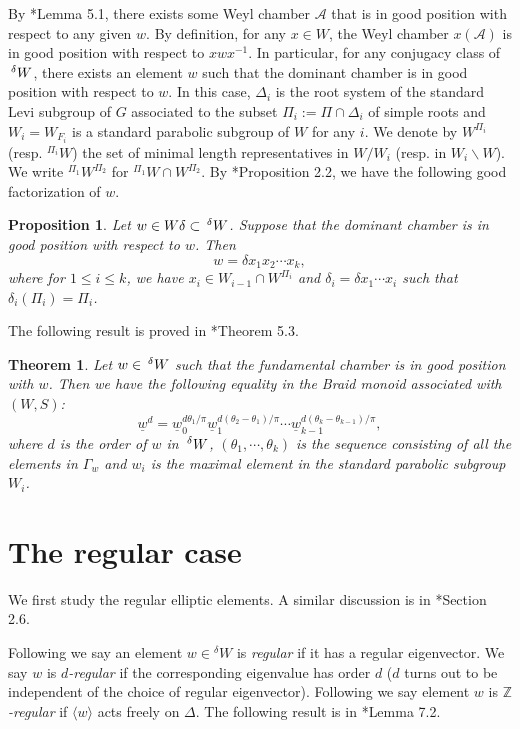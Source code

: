\documentclass[10pt,leqno]{article}
\newtheorem{theorem}[equation]{Theorem}
\newtheorem{proposition}[equation]{Proposition}
\newcommand{\caA}{\mathcal A}
\renewcommand{\sec}[1]{\section{#1}
\renewcommand{\theequation}{\thesection.\arabic{equation}}
  \setcounter{equation}{0}}
\newcommand{\Wext}{\negthinspace\negthinspace\phantom{a}^\delta W}
\def\le{\leqslant}
\def\G{\Gamma}
\def\d{\delta}
\renewcommand{\sec}[1]{\section{#1}
\renewcommand{\theequation}{\thesection.\arabic{equation}}
  \setcounter{equation}{0}}
\begin{document}
By \cite{he_nie_minimal_finite}*{Lemma 5.1}, there exists some Weyl chamber $\caA$ that is
in good position with respect to any given $w$. By definition, for any
$x \in W$, the Weyl chamber $x(\caA)$ is in good position with respect
to $x w x^{-1}$. In particular, for any conjugacy class of $\Wext$,
there exists an element $w$ such that the dominant chamber is in good
position with respect to $w$. In this case, $\Delta_i$ is the root system
of the standard Levi subgroup of $G$ associated to the subset
$\Pi_i:=\Pi \cap \Delta_i$ of simple roots and $W_i=W_{F_i}$ is a standard
parabolic subgroup of $W$ for any $i$. We denote by $W^{\Pi_i}$ (resp. ${}^{\Pi_i} W$) the
set of minimal length representatives in $W/W_i$ (resp. in $W_i \backslash W$). We write ${}^{\Pi_1} W^{\Pi_2}$ for ${}^{\Pi_1} W \cap W^{\Pi_2}$. By \cite{he_nie_minimal_finite}*{Proposition
2.2}, we have the following good factorization of $w$.

\begin{proposition}\label{good-fac} Let $w \in W \d \subset
\Wext$. Suppose that the dominant chamber is in good position with
respect to $w$. Then $$w=\d x_1 x_2 \cdots x_k,$$ where for $1 \le i
\le k$, we have $x_i \in W_{i-1} \cap W^{\Pi_i}$ and $\d_i=\d x_1
\cdots x_{i}$ such that $\d_i (\Pi_i)=\Pi_i$.
\end{proposition}

The following result is proved in \cite{he_nie_minimal_finite}*{Theorem 5.3}.

\begin{theorem}
\label{t:braid}
Let $w \in \Wext$ such that the fundamental chamber is
in good position with $w$. Then we have the following equality in the
Braid monoid associated with $(W, S)$: $$\underline w^d=\underline
w_0^{d \theta_1/\pi} \underline w_1^{d (\theta_2-\theta_1)/\pi} \cdots
\underline w_{k-1}^{d (\theta_{k}-\theta_{k-1})/\pi},$$ where $d$ is
the order of $w$ in $\Wext$, $(\theta_1, \cdots,
\theta_k)$ is the sequence consisting of all the elements in $\G_{w}$
and $w_i$ is the maximal element in the standard parabolic subgroup
$W_i$.
\end{theorem}

\sec{The regular case}
\label{s:regular}

We first study the regular elliptic elements. 
A similar discussion is in \cite{reeder_torsion}*{Section 2.6}.

Following
\cite{springer_regular} we say an element $w \in {}^{\delta} W$ is {\it regular} if it has a
regular eigenvector. We say $w$ is {\it $d$-regular} if the corresponding eigenvalue has
order $d$ ($d$ turns out to be independent of the choice of regular eigenvector).
Following \cite{rgly} we say
element $w$ is {\it $\mathbb Z$-regular} if $\langle w\rangle$ acts freely
on $\Delta$. The following result is in \cite{AH}*{Lemma 7.2}.
\end{document}

